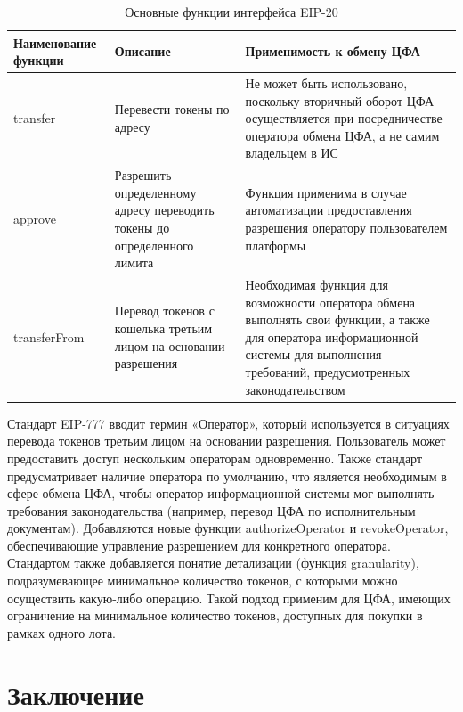 \documentclass[a4paper, 10pt]{article}
\begin{document}
	\begin{longtable}{|p{3.5cm}|p{6.1cm}|p{6.2cm}|}
		\caption{Основные функции интерфейса EIP-20}
		\label{table:erc20}\\
		\hline
		
		\textbf{Наименование функции} 
		& \textbf{Описание} 
		& \textbf{Применимость к обмену ЦФА}\\
		\hline
		
		transfer
		& Перевести токены по адресу
		& Не может быть использовано, поскольку вторичный оборот ЦФА осуществляется при посредничестве оператора обмена ЦФА, а не самим владельцем в ИС\\
		\hline
		
		approve
		& Разрешить определенному адресу переводить токены до определенного лимита
		& Функция применима в случае автоматизации предоставления разрешения оператору пользователем платформы\\
		\hline
		
		transferFrom
		& Перевод токенов с кошелька третьим лицом на основании разрешения
		& Необходимая функция для возможности оператора обмена выполнять свои функции, а также для оператора информационной системы для выполнения требований, предусмотренных законодательством\\
		\hline
	\end{longtable}
	
	Стандарт EIP-777 вводит термин «Оператор», который используется в ситуациях перевода токенов третьим лицом на основании разрешения. Пользователь может предоставить доступ нескольким операторам одновременно. Также стандарт предусматривает наличие оператора по умолчанию, что является необходимым в сфере обмена ЦФА, чтобы оператор информационной системы мог выполнять требования законодательства (например, перевод ЦФА по исполнительным документам). Добавляются новые функции authorizeOperator и revokeOperator, обеспечивающие управление разрешением для конкретного оператора. Стандартом также добавляется понятие детализации (функция granularity), подразумевающее минимальное количество токенов, с которыми можно осуществить какую-либо операцию. Такой подход применим для ЦФА, имеющих ограничение на минимальное количество токенов, доступных для покупки в рамках одного лота. 
	
	\section*{Заключение}
	
\end{document}
